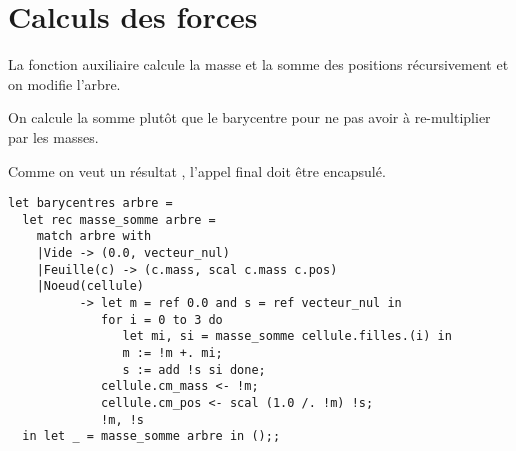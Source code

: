 \section{Calculs des forces}
\begin{Exercise}[title=Barycentres]
La fonction auxiliaire calcule la masse et la somme des positions récursivement et on modifie l'arbre.

On calcule la somme plutôt que le barycentre pour ne pas avoir à re-multiplier par les masses.

Comme on veut un résultat , l'appel final doit être encapsulé.
\begin{lstlisting}
let barycentres arbre =
  let rec masse_somme arbre =
    match arbre with
    |Vide -> (0.0, vecteur_nul)
    |Feuille(c) -> (c.mass, scal c.mass c.pos)
    |Noeud(cellule) 
          -> let m = ref 0.0 and s = ref vecteur_nul in
             for i = 0 to 3 do
                let mi, si = masse_somme cellule.filles.(i) in
                m := !m +. mi;
                s := add !s si done;
             cellule.cm_mass <- !m;
             cellule.cm_pos <- scal (1.0 /. !m) !s;
             !m, !s
  in let _ = masse_somme arbre in ();;
\end{lstlisting}
\end{Exercise}
